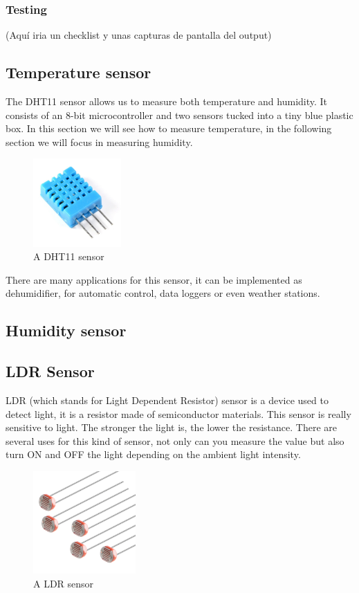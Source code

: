 \subsubsection{Testing}

(Aquí iria un checklist y unas capturas de pantalla del output)

\subsection{Temperature sensor}
The DHT11 sensor\cite{dht11-manual} allows us to measure both temperature and humidity. It consists of an 8-bit microcontroller and two sensors tucked into a tiny blue plastic box. In this section we will see how to measure temperature, in the following section we will focus in measuring humidity.

\begin{figure}[H]
    \centering
    \includegraphics[width=0.3\textwidth]{fig/dht11.jpg}
    \caption{A DHT11 sensor}
    \label{fig:dht11}
\end{figure}

There are many applications for this sensor, it can be implemented as dehumidifier, for automatic control, data loggers or even weather stations. 

\subsection{Humidity sensor}

\subsection{LDR Sensor}
LDR (which stands for Light Dependent Resistor) sensor is a device used to detect light, it is a resistor made of semiconductor materials. This sensor is really sensitive to light. The stronger the light is, the lower the resistance. There are several uses for this kind of sensor, not only can you measure the value but also turn ON and OFF the light depending on the ambient light intensity.

\begin{figure}[htp]
    \centering
    \includegraphics[width=0.35\textwidth]{fig/ldr.jpg}
    \caption{A LDR sensor}
    \label{fig:ldr}
\end{figure}

